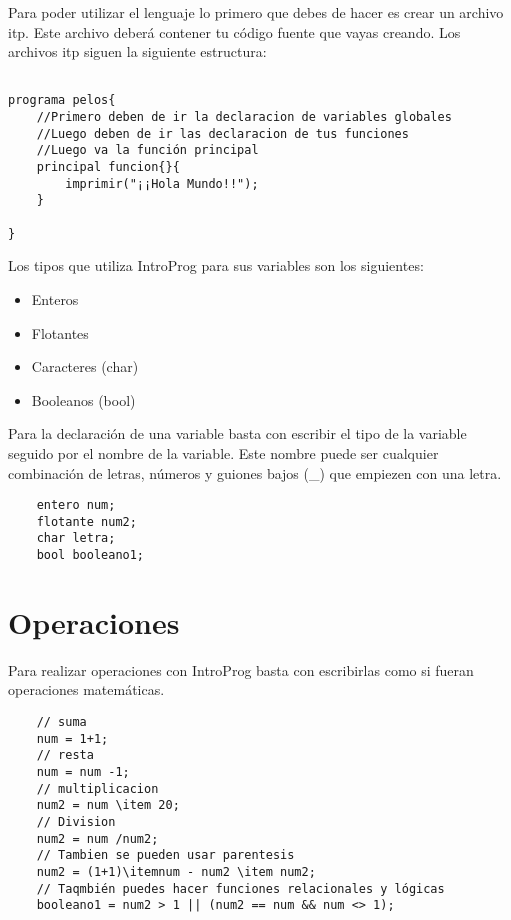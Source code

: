 Para poder utilizar el lenguaje lo primero que debes de hacer es crear un archivo itp. Este archivo deberá contener tu código fuente que vayas creando.
Los archivos itp siguen la siguiente estructura:
\begin{lstlisting}

programa pelos{
    //Primero deben de ir la declaracion de variables globales
    //Luego deben de ir las declaracion de tus funciones
    //Luego va la función principal
    principal funcion{}{
        imprimir("¡¡Hola Mundo!!");
    }

}

\end{lstlisting}

Los tipos que utiliza IntroProg para sus variables son los siguientes:
\begin{itemize}
    \item Enteros
    \item Flotantes
    \item Caracteres (char)
    \item Booleanos (bool)
\end{itemize}

Para la declaración de una variable basta con escribir el tipo de la variable seguido por el nombre de la variable. Este nombre puede ser cualquier combinación de letras, números y guiones bajos (\_) que empiezen con una letra.

\begin{lstlisting}
    entero num;
    flotante num2;
    char letra;
    bool booleano1;
\end{lstlisting}

\section{Operaciones}

Para realizar operaciones con IntroProg basta con escribirlas como si fueran operaciones matemáticas.
\begin{lstlisting}
    // suma
    num = 1+1;
    // resta
    num = num -1;
    // multiplicacion
    num2 = num \item 20;
    // Division
    num2 = num /num2;
    // Tambien se pueden usar parentesis
    num2 = (1+1)\itemnum - num2 \item num2;
    // Taqmbién puedes hacer funciones relacionales y lógicas
    booleano1 = num2 > 1 || (num2 == num && num <> 1); 
\end{lstlisting}

